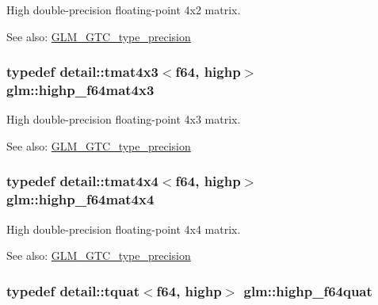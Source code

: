 High double-precision floating-point 4x2 matrix. \begin{Desc}
\item[See also:]\hyperlink{group__gtc__type__precision}{GLM\_\-GTC\_\-type\_\-precision} \end{Desc}
\hypertarget{group__gtc__type__precision_g0264562b4667b8073b7708efc2280691}{
\subsubsection[highp\_\-f64mat4x3]{\setlength{\rightskip}{0pt plus 5cm}typedef detail::tmat4x3$<$f64, highp$>$ {\bf glm::highp\_\-f64mat4x3}}}
\label{group__gtc__type__precision_g0264562b4667b8073b7708efc2280691}


High double-precision floating-point 4x3 matrix. \begin{Desc}
\item[See also:]\hyperlink{group__gtc__type__precision}{GLM\_\-GTC\_\-type\_\-precision} \end{Desc}
\hypertarget{group__gtc__type__precision_ga95b52552df369b75d09155ebb29b1bd}{
\subsubsection[highp\_\-f64mat4x4]{\setlength{\rightskip}{0pt plus 5cm}typedef detail::tmat4x4$<$f64, highp$>$ {\bf glm::highp\_\-f64mat4x4}}}
\label{group__gtc__type__precision_ga95b52552df369b75d09155ebb29b1bd}


High double-precision floating-point 4x4 matrix. \begin{Desc}
\item[See also:]\hyperlink{group__gtc__type__precision}{GLM\_\-GTC\_\-type\_\-precision} \end{Desc}
\hypertarget{group__gtc__type__precision_g9372e8b60f401fd94aba637b3ed17cfc}{
\subsubsection[highp\_\-f64quat]{\setlength{\rightskip}{0pt plus 5cm}typedef detail::tquat$<$f64, highp$>$ {\bf glm::highp\_\-f64quat}}}
\label{group__gtc__type__precision_g9372e8b60f401fd94aba637b3ed17cfc}


